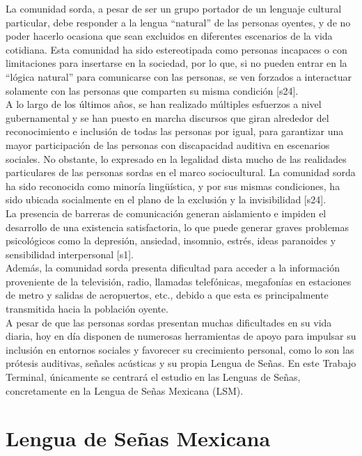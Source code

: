 La comunidad sorda, a pesar de ser un grupo portador de un lenguaje cultural particular, debe responder a la lengua “natural” de las personas oyentes, y de no poder hacerlo ocasiona que sean excluidos en diferentes escenarios de la vida cotidiana. Esta comunidad ha sido estereotipada como personas incapaces o con limitaciones para insertarse en la sociedad, por lo que, si no pueden entrar en la “lógica natural” para comunicarse con las personas, se ven forzados a interactuar solamente con las personas que comparten su misma condición [s24].\\

A lo largo de los últimos años, se han realizado múltiples esfuerzos a nivel gubernamental y se han puesto en marcha discursos que giran alrededor del reconocimiento e inclusión de todas las personas por igual, para garantizar una mayor participación de las personas con discapacidad auditiva en escenarios sociales. No obstante, lo expresado en la legalidad dista mucho de las realidades particulares de las personas sordas en el marco sociocultural. La comunidad sorda ha sido reconocida como minoría lingüística, y por sus mismas condiciones, ha sido ubicada socialmente en el plano de la exclusión y la invisibilidad [s24]. \\ 

La presencia de barreras de comunicación generan aislamiento e impiden el desarrollo de una existencia satisfactoria, lo que puede generar graves problemas psicológicos como la depresión, ansiedad, insomnio, estrés, ideas paranoides y sensibilidad interpersonal [s1].\\

Además, la comunidad sorda presenta dificultad para acceder a la información proveniente de la televisión, radio, llamadas telefónicas, megafonías en estaciones de metro y salidas de aeropuertos, etc., debido a que esta es principalmente transmitida hacia la población oyente.\\

\newpage A pesar de que las personas sordas presentan muchas dificultades en su vida diaria, hoy en día disponen de numerosas herramientas de apoyo para impulsar su inclusión en entornos sociales y favorecer su crecimiento personal, como lo son las prótesis auditivas, señales acústicas y su propia Lengua de Señas. En este Trabajo Terminal, únicamente se centrará el estudio en las Lenguas de Señas, concretamente en la Lengua de Señas Mexicana (LSM).\\

\section{Lengua de Señas Mexicana}
